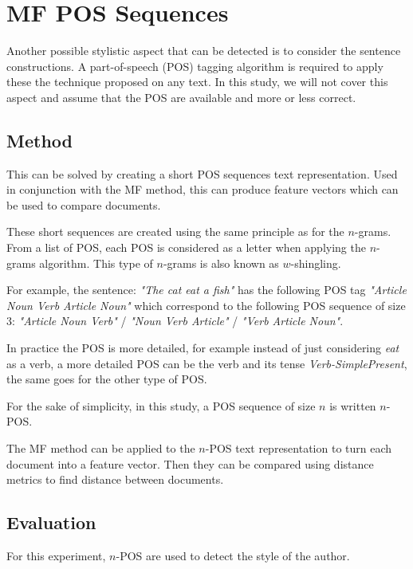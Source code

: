 \section{MF POS Sequences \label{sec:pos_sequences}}

Another possible stylistic aspect that can be detected is to consider the sentence constructions.
A part-of-speech (POS) tagging algorithm is required to apply these the technique proposed on any text.
In this study, we will not cover this aspect and assume that the POS are available and more or less correct.

\subsection{Method}

This can be solved by creating a short POS sequences text representation.
Used in conjunction with the MF method, this can produce feature vectors which can be used to compare documents.

These short sequences are created using the same principle as for the $n$-grams.
From a list of POS, each POS is considered as a letter when applying the $n$-grams algorithm.
This type of $n$-grams is also known as $w$-shingling.

For example, the sentence: \textit{"The cat eat a fish"} has the following POS tag \textit{"Article Noun Verb Article Noun"} which correspond to the following POS sequence of size 3: \textit{"Article Noun Verb"} / \textit{"Noun Verb Article"} / \textit{"Verb Article Noun"}.

In practice the POS is more detailed, for example instead of just considering \textit{eat} as a verb, a more detailed POS can be the verb and its tense \textit{Verb-SimplePresent}, the same goes for the other type of POS.

For the sake of simplicity, in this study, a POS sequence of size $n$ is written $n$-POS.

The MF method can be applied to the $n$-POS text representation to turn each document into a feature vector.
Then they can be compared using distance metrics to find distance between documents.

\subsection{Evaluation}

For this experiment, $n$-POS are used to detect the style of the author.

